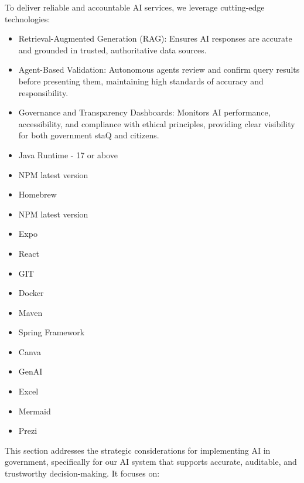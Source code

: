 
To deliver reliable and accountable AI services, we leverage cutting-edge
technologies:
\begin{itemize}
    \item Retrieval-Augmented Generation (RAG): Ensures AI responses are accurate
    and grounded in trusted, authoritative data sources.
    \item Agent-Based Validation: Autonomous agents review and confirm query results
    before presenting them, maintaining high standards of accuracy and
    responsibility.
    \item Governance and Transparency Dashboards: Monitors AI performance,
    accessibility, and compliance with ethical principles, providing clear visibility for
    both government staQ and citizens.
\end{itemize}


\begin{itemize}
    \item Java Runtime - 17 or above
    \item NPM latest version
    \item Homebrew
    \item NPM latest version
    \item Expo
    \item React
    \item GIT
    \item Docker
    \item Maven
    \item Spring Framework
\end{itemize}

\begin{itemize}
    \item Canva
    \item GenAI
    \item Excel
    \item Mermaid
    \item Prezi
\end{itemize}







This section addresses the strategic considerations for implementing AI in government, specifically for our AI system that supports accurate, auditable, and trustworthy decision-making. It focuses on:

